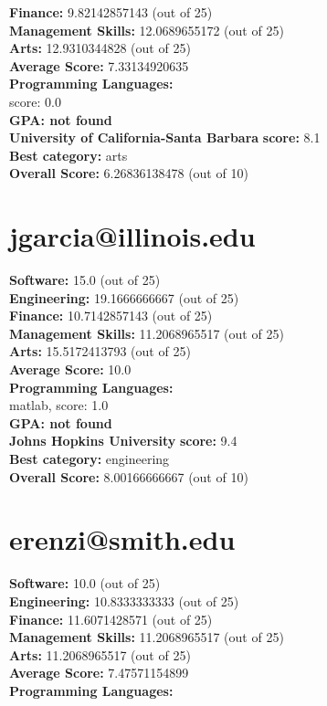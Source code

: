\documentclass{article}
\begin{document}
\textbf{Finance:} 9.82142857143 (out of 25)\\
\textbf{Management Skills:} 12.0689655172 (out of 25)\\
\textbf{Arts:} 12.9310344828 (out of 25)\\
\textbf{Average Score: } 7.33134920635\\
\textbf{Programming Languages:} \\
score: 0.0\\
\textbf{GPA: not found}\\
\textbf{University of California-Santa Barbara} \textbf{score:} 8.1\\
\textbf{Best category: } arts\\
\textbf{Overall Score: }6.26836138478 (out of 10)\section{jgarcia@illinois.edu}
\textbf{Software:} 15.0 (out of 25)\\
\textbf{Engineering: } 19.1666666667 (out of 25)\\
\textbf{Finance:} 10.7142857143 (out of 25)\\
\textbf{Management Skills:} 11.2068965517 (out of 25)\\
\textbf{Arts:} 15.5172413793 (out of 25)\\
\textbf{Average Score: } 10.0\\
\textbf{Programming Languages:} \\
matlab, score: 1.0\\
\textbf{GPA: not found}\\
\textbf{Johns Hopkins University} \textbf{score:} 9.4\\
\textbf{Best category: } engineering\\
\textbf{Overall Score: }8.00166666667 (out of 10)\section{erenzi@smith.edu}
\textbf{Software:} 10.0 (out of 25)\\
\textbf{Engineering: } 10.8333333333 (out of 25)\\
\textbf{Finance:} 11.6071428571 (out of 25)\\
\textbf{Management Skills:} 11.2068965517 (out of 25)\\
\textbf{Arts:} 11.2068965517 (out of 25)\\
\textbf{Average Score: } 7.47571154899\\
\textbf{Programming Languages:} \\
\end{document}
